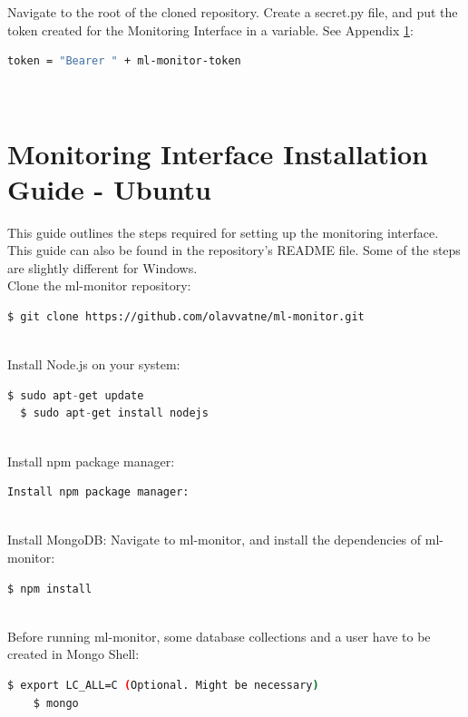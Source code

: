 \noindent Navigate to the root of the cloned repository. Create a secret.py file, and put the token created for the Monitoring Interface in a variable. See Appendix \ref{app:monitorInstall}:
\begin{lstlisting}[language=bash]
  token = "Bearer " + ml-monitor-token
\end{lstlisting}
~\\

\section{Monitoring Interface Installation Guide - Ubuntu}
\label{app:monitorInstall}
This guide outlines the steps required for setting up the monitoring interface. This guide can also be found in the repository's README file. Some of the steps are slightly different for Windows. \\

\noindent Clone the ml-monitor repository:
\begin{lstlisting}[language=bash]
  $ git clone https://github.com/olavvatne/ml-monitor.git
\end{lstlisting}
~\\

\noindent Install Node.js on your system:
\begin{lstlisting}[language=Python]
  $ sudo apt-get update
  $ sudo apt-get install nodejs
\end{lstlisting}
~\\

\noindent Install npm package manager:
\begin{lstlisting}[language=bash]
    Install npm package manager:
\end{lstlisting}
~\\

\noindent Install MongoDB:
\noindent Navigate to ml-monitor, and install the dependencies of ml-monitor:
\begin{lstlisting}[language=bash]
    $ npm install
\end{lstlisting}
~\\

\noindent Before running ml-monitor, some database collections and a user have to be created in Mongo Shell:
\begin{lstlisting}[language=bash]
    $ export LC_ALL=C (Optional. Might be necessary)
    $ mongo
\end{lstlisting}
~\\

